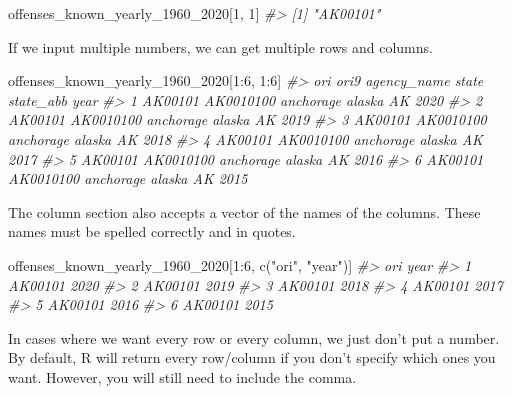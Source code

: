 \documentclass[
]{krantz}
\makeatletter
\newenvironment{Shaded}{\begin{snugshade}}{\end{snugshade}}
\newcommand{\CommentTok}[1]{\textcolor[rgb]{0.37,0.37,0.37}{\textit{#1}}}
\newcommand{\DecValTok}[1]{\textcolor[rgb]{0.06,0.06,0.06}{#1}}
\newcommand{\FunctionTok}[1]{\textcolor[rgb]{0,0,0}{#1}}
\newcommand{\NormalTok}[1]{#1}
\newcommand{\SpecialCharTok}[1]{\textcolor[rgb]{0,0,0}{#1}}
\newcommand{\StringTok}[1]{\textcolor[rgb]{0.5,0.5,0.5}{#1}}
\newenvironment{kframe}{%
\medskip{}
\setlength{\fboxsep}{.8em}
 \def\at@end@of@kframe{}%
 \ifinner\ifhmode%
  \def\at@end@of@kframe{\end{minipage}}%
  \begin{minipage}{\columnwidth}%
 \fi\fi%
 \def\FrameCommand##1{\hskip\@totalleftmargin \hskip-\fboxsep
 \colorbox{shadecolor}{##1}\hskip-\fboxsep
     \hskip-\linewidth \hskip-\@totalleftmargin \hskip\columnwidth}%
 \MakeFramed {\advance\hsize-\width
   \@totalleftmargin\z@ \linewidth\hsize
   \@setminipage}}%
 {\par\unskip\endMakeFramed%
 \at@end@of@kframe}
\renewenvironment{Shaded}{\begin{kframe}}{\end{kframe}}
\makeatother
\begin{document}
\begin{Shaded}
\begin{Highlighting}[]
\NormalTok{offenses\_known\_yearly\_1960\_2020[}\DecValTok{1}\NormalTok{, }\DecValTok{1}\NormalTok{]}
\CommentTok{\#\textgreater{} [1] "AK00101"}
\end{Highlighting}
\end{Shaded}

If we input multiple numbers, we can get multiple rows and columns.

\begin{Shaded}
\begin{Highlighting}[]
\NormalTok{offenses\_known\_yearly\_1960\_2020[}\DecValTok{1}\SpecialCharTok{:}\DecValTok{6}\NormalTok{, }\DecValTok{1}\SpecialCharTok{:}\DecValTok{6}\NormalTok{]}
\CommentTok{\#\textgreater{}       ori      ori9 agency\_name  state state\_abb year}
\CommentTok{\#\textgreater{} 1 AK00101 AK0010100   anchorage alaska        AK 2020}
\CommentTok{\#\textgreater{} 2 AK00101 AK0010100   anchorage alaska        AK 2019}
\CommentTok{\#\textgreater{} 3 AK00101 AK0010100   anchorage alaska        AK 2018}
\CommentTok{\#\textgreater{} 4 AK00101 AK0010100   anchorage alaska        AK 2017}
\CommentTok{\#\textgreater{} 5 AK00101 AK0010100   anchorage alaska        AK 2016}
\CommentTok{\#\textgreater{} 6 AK00101 AK0010100   anchorage alaska        AK 2015}
\end{Highlighting}
\end{Shaded}

The column section also accepts a vector of the names of the columns. These names must be spelled correctly and in quotes.

\begin{Shaded}
\begin{Highlighting}[]
\NormalTok{offenses\_known\_yearly\_1960\_2020[}\DecValTok{1}\SpecialCharTok{:}\DecValTok{6}\NormalTok{, }\FunctionTok{c}\NormalTok{(}\StringTok{"ori"}\NormalTok{, }\StringTok{"year"}\NormalTok{)]}
\CommentTok{\#\textgreater{}       ori year}
\CommentTok{\#\textgreater{} 1 AK00101 2020}
\CommentTok{\#\textgreater{} 2 AK00101 2019}
\CommentTok{\#\textgreater{} 3 AK00101 2018}
\CommentTok{\#\textgreater{} 4 AK00101 2017}
\CommentTok{\#\textgreater{} 5 AK00101 2016}
\CommentTok{\#\textgreater{} 6 AK00101 2015}
\end{Highlighting}
\end{Shaded}

In cases where we want every row or every column, we just don't put a number. By default, R will return every row/column if you don't specify which ones you want. However, you will still need to include the comma.
\end{document}
